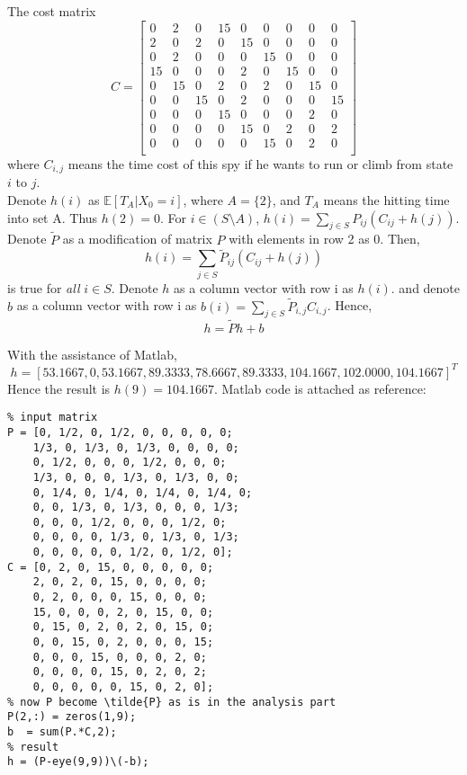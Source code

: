 \documentclass[  11pt]{article}
\begin{document}
\begin{ExerciseList}
The cost matrix \[C = \begin{bmatrix}
0 & 2 & 0 & 15 & 0 & 0 & 0 & 0 & 0 \\
2 & 0 & 2 & 0 & 15 & 0 & 0 & 0 & 0 \\
0 & 2 & 0 & 0 & 0 & 15 & 0 & 0 & 0 \\
15 & 0 & 0 & 0 & 2 & 0 & 15 & 0 & 0 \\
0 & 15 & 0 & 2 & 0 & 2 & 0 & 15 & 0 \\
0 & 0 & 15 & 0 & 2 & 0 & 0 & 0 & 15 \\
0 & 0 & 0 & 15 & 0 & 0 & 0 & 2 & 0 \\
0 & 0 & 0 & 0 & 15 & 0 & 2 & 0 & 2 \\
0 & 0 & 0 & 0 & 0 & 15 & 0 & 2 & 0\\
\end{bmatrix}\]
where $C_{i,j}$ means the time cost of this spy if he wants to run or climb from state $i$ to $j$.\\

Denote $h(i)$ as $\mathbb{E} [T_A | X_0 = i]$, where $A = \{2\}$, and $T_A$ means the hitting time into set A. Thus $h(2) = 0$. For $i\in (S\setminus A)$, $h(i) = \sum_{j\in S} P_{ij}(C_{ij} + h(j))$.\\

Denote $\tilde{P}$ as a modification of matrix $P$ with elements in row 2 as 0. Then, \[h(i) = \sum_{j\in S} \tilde{P}_{ij}(C_{ij} + h(j))\] is true for {\it all} $i\in S$. Denote $h$ as a column vector with row i as $h(i)$.
and denote $b$ as a column vector with row i as $b(i) = \sum_{j\in S} \tilde{P}_{i,j}C_{i,j}$. Hence, 
\[h = \tilde{P}h + b\]

With the assistance of Matlab,  
$$h = [53.1667 ,
         0  ,
   53.1667,  
   89.3333 ,
   78.6667 ,
   89.3333 ,
  104.1667 ,
  102.0000 ,
  104.1667
]^T$$
Hence the result is $h(9) = 104.1667$.
\newpage
Matlab code is attached as reference:
\begin{lstlisting}
% input matrix
P = [0, 1/2, 0, 1/2, 0, 0, 0, 0, 0;
    1/3, 0, 1/3, 0, 1/3, 0, 0, 0, 0;
    0, 1/2, 0, 0, 0, 1/2, 0, 0, 0;
    1/3, 0, 0, 0, 1/3, 0, 1/3, 0, 0;
    0, 1/4, 0, 1/4, 0, 1/4, 0, 1/4, 0;
    0, 0, 1/3, 0, 1/3, 0, 0, 0, 1/3;
    0, 0, 0, 1/2, 0, 0, 0, 1/2, 0;
    0, 0, 0, 0, 1/3, 0, 1/3, 0, 1/3;
    0, 0, 0, 0, 0, 1/2, 0, 1/2, 0];
C = [0, 2, 0, 15, 0, 0, 0, 0, 0;
    2, 0, 2, 0, 15, 0, 0, 0, 0;
    0, 2, 0, 0, 0, 15, 0, 0, 0;
    15, 0, 0, 0, 2, 0, 15, 0, 0;
    0, 15, 0, 2, 0, 2, 0, 15, 0;
    0, 0, 15, 0, 2, 0, 0, 0, 15;
    0, 0, 0, 15, 0, 0, 0, 2, 0;
    0, 0, 0, 0, 15, 0, 2, 0, 2;
    0, 0, 0, 0, 0, 15, 0, 2, 0];
% now P become \tilde{P} as is in the analysis part
P(2,:) = zeros(1,9); 
b  = sum(P.*C,2);
% result
h = (P-eye(9,9))\(-b);
\end{lstlisting}

 
\end{ExerciseList}
\end{document}
